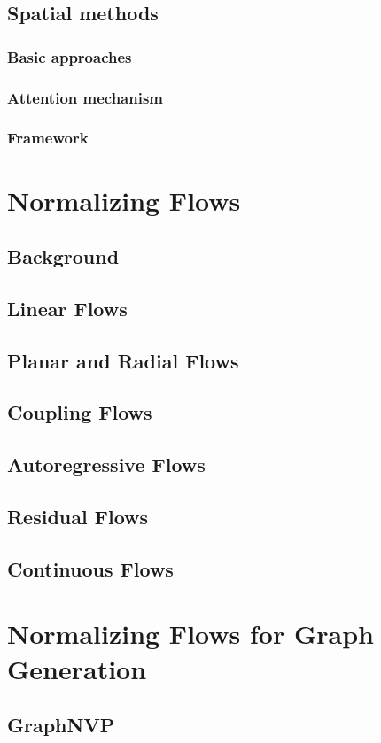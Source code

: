 \section{Spatial methods}
\subsection{Basic approaches}
\subsection{Attention mechanism}
\subsection{Framework}

\chapter{Normalizing Flows}
\label{c:nf}
\section{Background}
\section{Linear Flows}
\section{Planar and Radial Flows}
\section{Coupling Flows}
\section{Autoregressive Flows}
\section{Residual Flows}
\section{Continuous Flows}

\chapter{Normalizing Flows for Graph Generation}
\label{c:gnf}
\section{GraphNVP}
